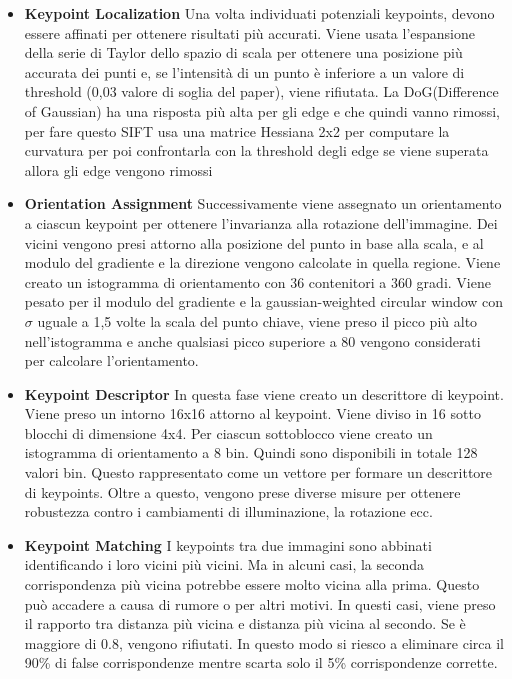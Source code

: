 \begin{itemize}
\item \textbf{Keypoint Localization}
Una volta individuati potenziali keypoints, devono essere affinati per ottenere risultati più accurati. Viene usata l'espansione della serie di Taylor dello spazio di scala per ottenere una posizione più accurata dei punti e, se l'intensità di un punto è inferiore a un valore di threshold (0,03 valore di soglia del paper), viene rifiutata.
La DoG(Difference of Gaussian) ha una risposta più alta per gli edge e che quindi vanno rimossi, per fare questo SIFT usa una matrice Hessiana 2x2 per computare la curvatura per poi confrontarla con la threshold degli edge se viene superata allora gli edge vengono rimossi
\item \textbf{Orientation Assignment}
Successivamente viene assegnato un orientamento a ciascun keypoint per ottenere l'invarianza alla rotazione dell'immagine. Dei vicini vengono presi attorno alla posizione del punto in base alla scala, e al modulo del gradiente e la direzione vengono calcolate in quella regione. Viene creato un istogramma di orientamento con 36 contenitori a 360 gradi. Viene pesato per il modulo del gradiente e la gaussian-weighted circular window con $\sigma$ uguale a 1,5 volte la scala del punto chiave, viene preso il picco più alto nell'istogramma e anche qualsiasi picco superiore a 80 vengono considerati per calcolare l'orientamento.
\item \textbf{Keypoint Descriptor}
In questa fase viene creato un descrittore di keypoint. Viene preso un intorno 16x16 attorno al keypoint. Viene  diviso in 16 sotto blocchi di dimensione 4x4. Per ciascun sottoblocco viene creato un istogramma di orientamento a 8 bin. Quindi sono disponibili in totale 128 valori bin. Questo rappresentato come un vettore per formare un descrittore di keypoints. Oltre a questo, vengono prese diverse misure per ottenere robustezza contro i cambiamenti di illuminazione, la rotazione ecc.
\item \textbf{Keypoint Matching}
I keypoints tra due immagini sono abbinati identificando i loro vicini più vicini. Ma in alcuni casi, la seconda corrispondenza più vicina potrebbe essere molto vicina alla prima. Questo può accadere a causa di rumore o per altri motivi. In questi casi, viene preso il rapporto tra distanza più vicina e distanza più vicina al secondo. Se è maggiore di 0.8, vengono rifiutati. In questo modo si riesco a eliminare circa il 90\% di false corrispondenze mentre scarta solo il 5\% corrispondenze corrette.
\end{itemize}
